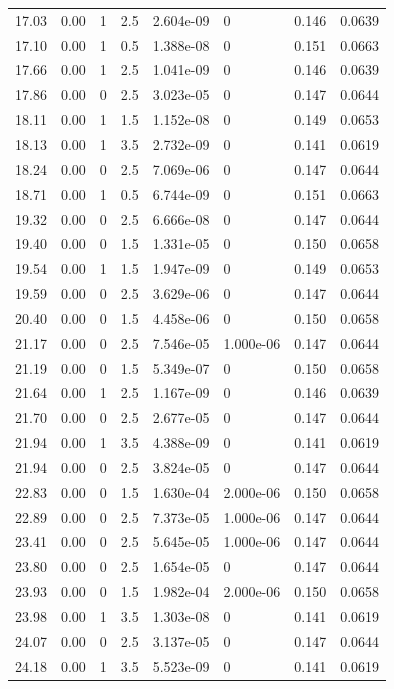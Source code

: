 \documentclass[preview]{standalone}
\begin{document}
{{{\begin{tabular}{L{1.2cm}C{1.2cm} C{0.3cm}C{0.5cm} C{1.4cm}C{1.4cm} C{1.4cm}C{1.4cm}}
  17.03  &  0.00  & 1     & 2.5 &  2.604e-09  & 0  & 0.146 &  0.0639   \\ 
  17.10  &  0.00  & 1     & 0.5 &  1.388e-08  & 0  & 0.151 &  0.0663   \\ 
  17.66  &  0.00  & 1     & 2.5 &  1.041e-09  & 0  & 0.146 &  0.0639   \\ 
  17.86  &  0.00  & 0     & 2.5 &  3.023e-05  & 0  & 0.147 &  0.0644   \\ 
  18.11  &  0.00  & 1     & 1.5 &  1.152e-08  & 0  & 0.149 &  0.0653   \\ 
  18.13  &  0.00  & 1     & 3.5 &  2.732e-09  & 0  & 0.141 &  0.0619   \\ 
  18.24  &  0.00  & 0     & 2.5 &  7.069e-06  & 0  & 0.147 &  0.0644   \\ 
  18.71  &  0.00  & 1     & 0.5 &  6.744e-09  & 0  & 0.151 &  0.0663   \\ 
  19.32  &  0.00  & 0     & 2.5 &  6.666e-08  & 0  & 0.147 &  0.0644   \\ 
  19.40  &  0.00  & 0     & 1.5 &  1.331e-05  & 0  & 0.150 &  0.0658   \\ 
  19.54  &  0.00  & 1     & 1.5 &  1.947e-09  & 0  & 0.149 &  0.0653   \\ 
  19.59  &  0.00  & 0     & 2.5 &  3.629e-06  & 0  & 0.147 &  0.0644   \\ 
  20.40  &  0.00  & 0     & 1.5 &  4.458e-06  & 0  & 0.150 &  0.0658   \\ 
  21.17  &  0.00  & 0     & 2.5 &  7.546e-05  & 1.000e-06  & 0.147 &  0.0644   \\ 
  21.19  &  0.00  & 0     & 1.5 &  5.349e-07  & 0  & 0.150 &  0.0658   \\ 
  21.64  &  0.00  & 1     & 2.5 &  1.167e-09  & 0  & 0.146 &  0.0639   \\ 
  21.70  &  0.00  & 0     & 2.5 &  2.677e-05  & 0  & 0.147 &  0.0644   \\ 
  21.94  &  0.00  & 1     & 3.5 &  4.388e-09  & 0  & 0.141 &  0.0619   \\ 
  21.94  &  0.00  & 0     & 2.5 &  3.824e-05  & 0  & 0.147 &  0.0644   \\ 
  22.83  &  0.00  & 0     & 1.5 &  1.630e-04  & 2.000e-06  & 0.150 &  0.0658   \\ 
  22.89  &  0.00  & 0     & 2.5 &  7.373e-05  & 1.000e-06  & 0.147 &  0.0644   \\ 
  23.41  &  0.00  & 0     & 2.5 &  5.645e-05  & 1.000e-06  & 0.147 &  0.0644   \\ 
  23.80  &  0.00  & 0     & 2.5 &  1.654e-05  & 0  & 0.147 &  0.0644   \\ 
  23.93  &  0.00  & 0     & 1.5 &  1.982e-04  & 2.000e-06  & 0.150 &  0.0658   \\ 
  23.98  &  0.00  & 1     & 3.5 &  1.303e-08  & 0  & 0.141 &  0.0619   \\ 
  24.07  &  0.00  & 0     & 2.5 &  3.137e-05  & 0  & 0.147 &  0.0644   \\ 
  24.18  &  0.00  & 1     & 3.5 &  5.523e-09  & 0  & 0.141 &  0.0619   \\ 
\hline 
\end{tabular} 

}}}
\end{document}
